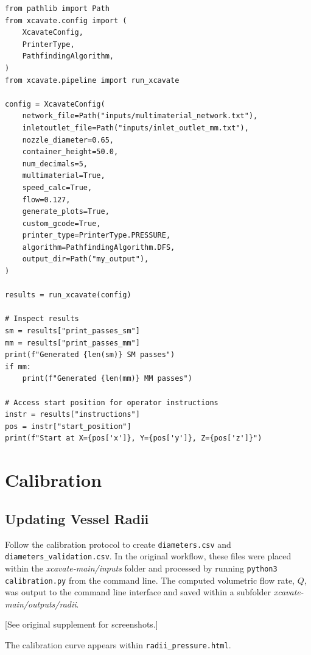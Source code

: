 \documentclass[11pt,letterpaper]{article}
\newcommand{\code}[1]{\texttt{#1}}
\begin{document}
\begin{lstlisting}[style=python]
from pathlib import Path
from xcavate.config import (
    XcavateConfig,
    PrinterType,
    PathfindingAlgorithm,
)
from xcavate.pipeline import run_xcavate

config = XcavateConfig(
    network_file=Path("inputs/multimaterial_network.txt"),
    inletoutlet_file=Path("inputs/inlet_outlet_mm.txt"),
    nozzle_diameter=0.65,
    container_height=50.0,
    num_decimals=5,
    multimaterial=True,
    speed_calc=True,
    flow=0.127,
    generate_plots=True,
    custom_gcode=True,
    printer_type=PrinterType.PRESSURE,
    algorithm=PathfindingAlgorithm.DFS,
    output_dir=Path("my_output"),
)

results = run_xcavate(config)

# Inspect results
sm = results["print_passes_sm"]
mm = results["print_passes_mm"]
print(f"Generated {len(sm)} SM passes")
if mm:
    print(f"Generated {len(mm)} MM passes")

# Access start position for operator instructions
instr = results["instructions"]
pos = instr["start_position"]
print(f"Start at X={pos['x']}, Y={pos['y']}, Z={pos['z']}")
\end{lstlisting}

\section{Calibration}
\label{sec:calibration}

\subsection{Updating Vessel Radii}

Follow the calibration protocol to create \code{diameters.csv} and
\code{diameters\_validation.csv}. In the original workflow, these files were
placed within the \textit{xcavate-main/inputs} folder and processed by running
\code{python3 calibration.py} from the command line. The computed volumetric
flow rate, $Q$, was output to the command line interface and saved within a
subfolder \textit{xcavate-main/outputs/radii}.

[See original supplement for screenshots.]

The calibration curve appears within \code{radii\_pressure.html}.
\end{document}
